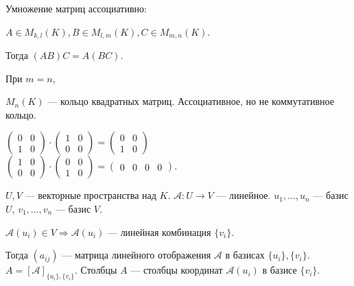 \begin{consequence}
    Умножение матриц ассоциативно:

    $A \in M_{k, l}(K), B \in M_{l, m}(K), C \in M_{m, n}(K)$.

    Тогда $(AB)C = A(BC)$.
\end{consequence}
\begin{definition}
    При $m = n$,

    $M_n(K)$ --- кольцо квадратных матриц. Ассоциативное, но не коммутативное кольцо.
\end{definition}
\begin{example}
    $\begin{pmatrix} 0 & 0 \\ 1 & 0 \end{pmatrix} \cdot \begin{pmatrix} 1 & 0 \\ 0 & 0 \end{pmatrix} = \begin{pmatrix} 0 & 0 \\ 1 & 0 \end{pmatrix}$\\
    $\begin{pmatrix} 1 & 0 \\ 0 & 0 \end{pmatrix} \cdot \begin{pmatrix} 0 & 0 \\ 1 & 0 \end{pmatrix} = \begin{pmatrix} 0 & 0 & 0 & 0 \end{pmatrix}$.
\end{example}

$U, V$ --- векторные пространства над  $K$.  $\mathcal{A}\!: U \to V$ --- линейное.  $u_1, \ldots, u_n$ --- базис $U$,  $v_1, \ldots, v_n$ --- базис $V$. 

$\mathcal{A}(u_i) \in V \Rightarrow \mathcal{A}(u_i)$ --- линейная комбинация  $\{ v_i \}$.

Тогда  $(a_{ij})$ --- матрица линейного отображения  $\mathcal{A}$ в базисах  $\{u_i\}, \{v_i\}$.  $A = [ \mathcal{A}]_{\{u_i\}, \{v_i\}}$. Столбцы  $A$ --- столбцы координат  $\mathcal{A}(u_i)$ в базисе  $\{v_i\}$.

